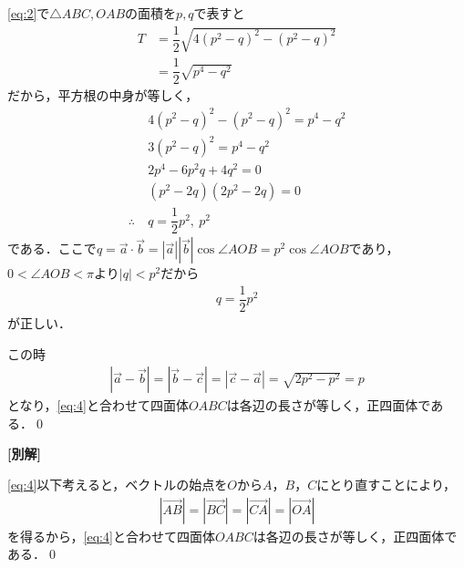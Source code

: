 \documentclass[../../main.tex]{subfiles}
\begin{document}
\cref{eq:2}で$\triangle ABC, OAB$の面積を$p,q$で表すと
\begin{align}
  T
  &=\dfrac{1}{2}\sqrt{4(p^2-q)^2-(p^2-q)^2}\\
  &=\dfrac{1}{2}\sqrt{p^4-q^2}
\end{align}
だから，平方根の中身が等しく，
\begin{align}
  & 4(p^2-q)^2-(p^2-q)^2=p^4-q^2\\
  & 3(p^2-q)^2=p^4-q^2\\
  & 2p^4-6p^2q+4q^2=0\\
  & (p^2-2q)(2p^2-2q)=0 \\
  \therefore\
  & q=\dfrac{1}{2}p^2,\ p^2 \label{eq:5}
\end{align}
である．ここで$q = \vec{a}\cdot\vec{b}=|\vec{a}||\vec{b}|\cos\angle AOB = p^2 \cos\angle AOB$であり，$0 < \angle AOB < \pi$より$|q|<p^2$だから
\begin{align}
  q=\dfrac{1}{2}p^2
\end{align}
が正しい．

この時
\begin{align}
  |\vec a-\vec b|=|\vec b-\vec c|=|\vec c-\vec a|=\sqrt{2p^2-p^2}=p
\end{align}
となり，\cref{eq:4}と合わせて四面体$OABC$は各辺の長さが等しく，正四面体である．\qed

{\bf [別解]}

\cref{eq:4}以下考えると，ベクトルの始点を$O$から$A$，$B$，$C$にとり直すことにより，
\begin{align}
  |\overrightarrow{AB}|=|\overrightarrow{BC}|=|\overrightarrow{CA}|=|\overrightarrow{OA}|
\end{align}
を得るから，\cref{eq:4}と合わせて四面体$OABC$は各辺の長さが等しく，正四面体である．\qed

\newpage
\end{document}
